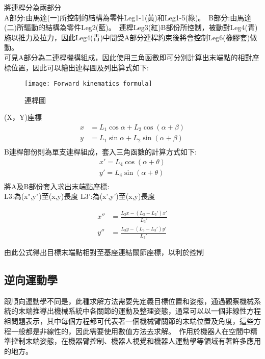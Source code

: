 將連桿分為兩部分\\
A部分:由馬達(一)所控制的結構為零件Leg1-1(黃)和Leg1-5(綠)。\
B部分:由馬達(二)所驅動的結構為零件Leg2(藍)。\
連桿Leg3(紅)B部份所控制，被動對Leg4(青)施以推力及拉力，因此Leg4(青)中間受A部分連桿約束後將會控制Leg6(橡膠套)做動。\\

可見A部分為二連桿機構組成，因此使用三角函數即可分別計算出末端點的相對座標位置，因此可以繪出連桿圖及列出算式如下:\
\begin{figure}[hbt!]
\begin{center}
\texttt{[image: Forward kinematics formula]}
\caption{\Large 連桿圖}\label{Forward kinematics formula}
\end{center}
\end{figure}
(X，Y)座標
\[
\begin{aligned}
x&=L_{1}\cos \alpha +L_{2}\cos \left( \alpha +\beta \right)\\
y&=L_{1}\sin \alpha +L_{2}\sin \left( \alpha +\beta \right)\\
\end{aligned}
\]
B連桿部份則為單支連桿組成，套入三角函數的計算方式如下:\\
\[
\begin{aligned}
x'=L_{4}\cos \left( \alpha +\theta \right)\\
y'=L_{4}\sin \left( \alpha +\theta \right)\\
\end{aligned}
\]
將A及B部份套入求出末端點座標:\\
L3:為(x",y")至(x,y)長度
L3':為(x',y')至(x,y)長度

\begin{align*}
x'' &= \frac{L_{3}x - (L_{3}-L_{3}')x'}{L_{3}'} \\
y'' &= \frac{L_{3}y - (L_{3}-L_{3}')y'}{L_{3}'}
\end{align*}

由此公式得出目標末端點相對至基座連結關節座標，以利於控制\\

\subsection{逆向運動學}
跟順向運動學不同是，此種求解方法需要先定義目標位置和姿態，通過觀察機械系統的末端推導出機械系統中各關節的運動及整理姿態，通常可以以一個非線性方程組問題表示，其中每個方程都可代表著一個機械臂關節的末端位置及角度，這些方程一般都是非線性的，因此需要使用數值方法去求解。\
作用於機器人在空間中精準控制末端姿態，在機器臂控制、機器人視覺和機器人運動學等領域有著許多應用的地方。\\


